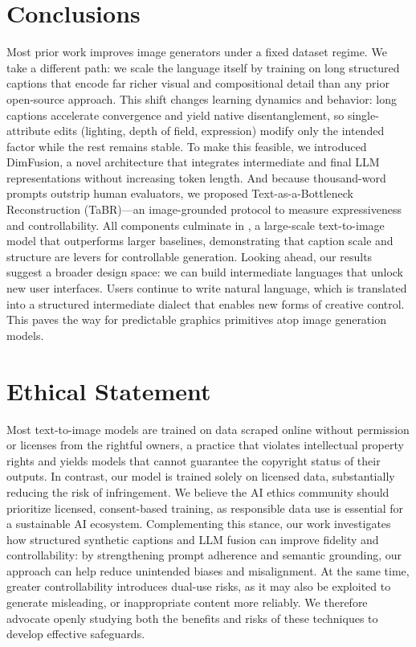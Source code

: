 
\vspace{-0.2cm}

\section{Conclusions}



Most prior work improves image generators under a fixed dataset regime. We take a different path: we scale the language itself by training on long structured captions that encode far richer visual and compositional detail than any prior open-source approach. This shift changes learning dynamics and behavior: long captions accelerate convergence and yield native disentanglement, so single-attribute edits (lighting, depth of field, expression) modify only the intended factor while the rest remains stable. To make this feasible, we introduced DimFusion, a novel architecture that integrates intermediate and final LLM representations without increasing token length. And because thousand-word prompts outstrip human evaluators, we proposed Text-as-a-Bottleneck Reconstruction (TaBR)—an image-grounded protocol to measure expressiveness and controllability. All components culminate in \modelname{}, a large-scale text-to-image model that outperforms larger baselines, demonstrating that caption scale and structure are levers for controllable generation. Looking ahead, our results suggest a broader design space: we can build intermediate languages that unlock new user interfaces. Users continue to write natural language, which is translated into a structured intermediate dialect that enables new forms of creative control. This paves the way for predictable graphics primitives atop image generation models.





\section{Ethical Statement}
\label{sec:ethics}



Most text-to-image models are trained on data scraped online without permission or licenses from the rightful owners, a practice that violates intellectual property rights and yields models that cannot guarantee the copyright status of their outputs. In contrast, our model is trained solely on licensed data, substantially reducing the risk of infringement. We believe the AI ethics community should prioritize licensed, consent-based training, as responsible data use is essential for a sustainable AI ecosystem. Complementing this stance, our work investigates how structured synthetic captions and LLM fusion can improve fidelity and controllability: by strengthening prompt adherence and semantic grounding, our approach can help reduce unintended biases and misalignment. At the same time, greater controllability introduces dual-use risks, as it may also be exploited to generate misleading, or inappropriate content more reliably. We therefore advocate openly studying both the benefits and risks of these techniques to develop effective safeguards.